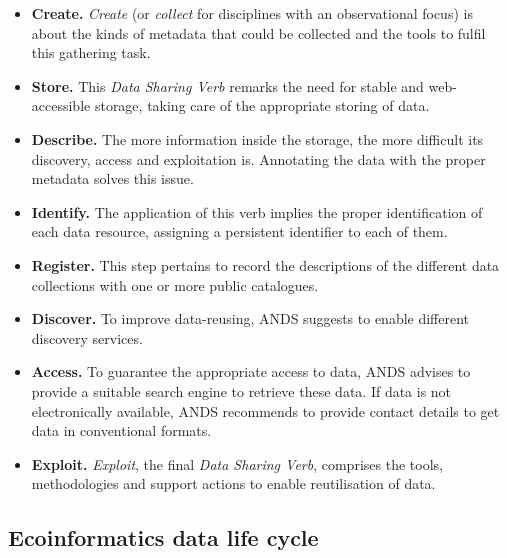 \begin{itemize}
    \item \textbf{Create.} \textit{Create} (or \textit{collect} for disciplines with an observational focus) is about the kinds of metadata that could be collected and the tools to fulfil this gathering task.
    \item \textbf{Store.} This \textit{Data Sharing Verb} remarks the need for stable and web-accessible storage, taking care of the appropriate storing of data.
    \item \textbf{Describe.} The more information inside the storage, the more difficult its discovery, access and exploitation is. Annotating the data with the proper metadata solves this issue.
    \item \textbf{Identify.} The application of this verb implies the proper identification of each data resource, assigning a persistent identifier to each of them.
    \item \textbf{Register.} This step pertains to record the descriptions of the different data collections with one or more public catalogues.
    \item \textbf{Discover.} To improve data-reusing, ANDS suggests to enable different discovery services.
    \item \textbf{Access.} To guarantee the appropriate access to data, ANDS advises to provide a suitable search engine to retrieve these data. If data is not electronically available, ANDS recommends to provide contact details to get data in conventional formats.
    \item \textbf{Exploit.} \textit{Exploit}, the final \textit{Data Sharing Verb}, comprises the tools, methodologies and support actions to enable reutilisation of data.
\end{itemize}

\subsection{Ecoinformatics data life cycle}


